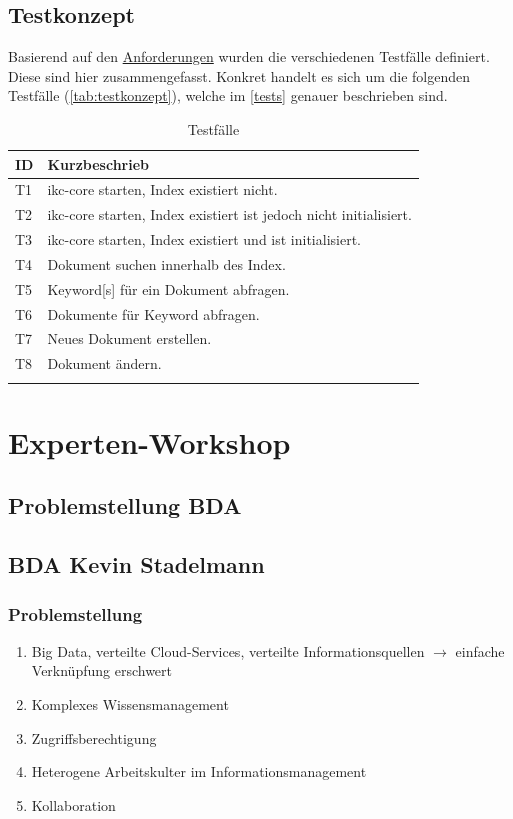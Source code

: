 \subsection{Testkonzept}
Basierend auf den \hyperref[anforderungen]{Anforderungen} wurden die verschiedenen Testfälle definiert. Diese sind hier zusammengefasst. Konkret handelt es sich um die folgenden Testfälle (\autoref{tab:testkonzept}), welche im \autoref{tests} genauer beschrieben sind.

\begin{longtable}{|p{1cm} | P{6cm} |}
  \hline
    ID & Kurzbeschrieb \\\hline
    T1 & \gls{ikc-core} starten, Index existiert nicht.\\\hline
    T2 & \gls{ikc-core} starten, Index existiert ist jedoch nicht initialisiert.\\\hline
    T3 & \gls{ikc-core} starten, Index existiert und ist initialisiert.\\\hline
    T4 & Dokument suchen innerhalb des Index.\\\hline
    T5 & \gls{Keyword}[s] für ein Dokument abfragen.\\\hline
    T6 & Dokumente für \gls{Keyword} abfragen.\\\hline
    T7 & Neues Dokument erstellen.\\\hline
    T8 & Dokument ändern.\\\hline
    \caption{Testfälle}
  \label{tab:testkonzept}
\end{longtable}


\section{Experten-Workshop}

\subsection{Problemstellung BDA}



\subsection{BDA Kevin Stadelmann}

\subsubsection{Problemstellung}

\begin{enumerate}
    \item Big Data, verteilte Cloud-Services, verteilte Informationsquellen $\rightarrow$ einfache Verknüpfung erschwert
    \item Komplexes Wissensmanagement
    \item Zugriffsberechtigung
    \item Heterogene Arbeitskulter im Informationsmanagement
    \item Kollaboration
\end{enumerate}

